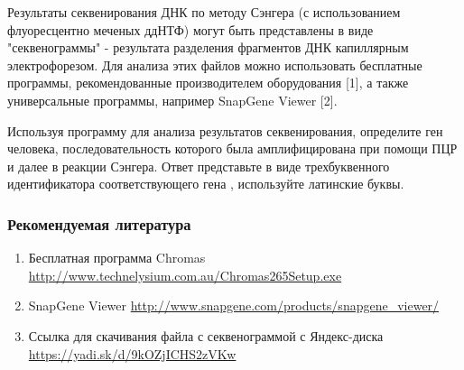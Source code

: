 
Результаты секвенирования ДНК по методу Сэнгера (с использованием флуоресцентно меченых ддНТФ) могут быть представлены в виде "секвенограммы" - результата разделения фрагментов ДНК капиллярным электрофорезом. Для анализа этих файлов можно использовать бесплатные программы, рекомендованные производителем оборудования [1], а также универсальные программы, например SnapGene Viewer [2].

Используя программу для анализа результатов секвенирования, определите ген человека, последовательность которого была амплифицирована при помощи ПЦР и далее в  реакции Сэнгера. Ответ представьте в виде трехбуквенного идентификатора соответствующего гена , используйте латинские буквы.

\subsubsection*{Рекомендуемая литература}

\begin{enumerate}
    \item Бесплатная программа Chromas\\ \url{http://www.technelysium.com.au/Chromas265Setup.exe}
    \item SnapGene Viewer \url{http://www.snapgene.com/products/snapgene_viewer/}
    \item Ссылка для скачивания файла с секвенограммой с Яндекс-диска  \url{https://yadi.sk/d/9kOZjICHS2zVKw} 
\end{enumerate}